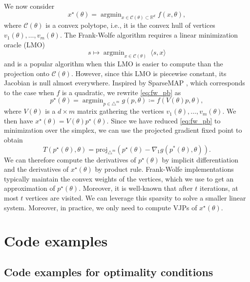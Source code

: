 \documentclass{article}
\def\cC{{\mathcal{C}}}
\def\RR{{\mathbb R}}
\def\proj{{\text{proj}}}
\DeclareMathOperator*{\argmin}{argmin}
\begin{document}
We now consider
\begin{equation}
x^\star(\theta) = \argmin_{x \in \cC(\theta) \subset \RR^d} f(x, \theta),
\label{eq:fw_pb}
\end{equation}
where $\cC(\theta)$ is a convex polytope, i.e., it is the convex hull of
vertices $v_1(\theta), \dots, v_m(\theta)$. The Frank-Wolfe algorithm requires a
linear minimization oracle (LMO)
\begin{equation*}
    s \mapsto \argmin_{x \in \cC(\theta)} ~\langle s, x \rangle
\end{equation*}
and is a popular algorithm when this LMO is easier to compute than
the projection onto $\cC(\theta)$. However, since this LMO is piecewise constant,
its Jacobian is null almost everywhere. Inspired by SparseMAP \cite{sparsemap},
which corresponds to the case when $f$ is a quadratic,
we rewrite \eqref{eq:fw_pb} as
\begin{equation}
p^\star(\theta) = \argmin_{p \in \triangle^m}
g(p, \theta) \coloneqq f(V(\theta) p, \theta),
\end{equation}
where $V(\theta)$ is a $d \times m$ matrix gathering the 
vertices $v_1(\theta), \dots, v_m(\theta)$.
We then have $x^\star(\theta) = V(\theta) p^\star(\theta)$.
Since we have reduced \eqref{eq:fw_pb} to minimization over the simplex,
we can use the projected gradient fixed point to obtain
\begin{equation}
T(p^\star(\theta), \theta) = 
\proj_{\triangle^m}(p^\star(\theta) - \nabla_1 g(p^*(\theta), \theta)).
\end{equation}
We can therefore compute the derivatives of $p^\star(\theta)$ by implicit
differentiation and the derivatives of $x^\star(\theta)$ by product rule.
Frank-Wolfe implementations typically maintain the 
convex weights of the vertices, which we use to get an approximation of
$p^\star(\theta)$. Moreover, it is well-known that after $t$
iterations, at most $t$ vertices are visited. We can leverage this sparsity to
solve a smaller linear system. Moreover, in practice,
we only need to compute VJPs of $x^\star(\theta)$.

\section{Code examples}
\label{appendix:code_examples}

\subsection{Code examples for optimality conditions}
\label{appendix:opt_cond_mapping}
\end{document}
